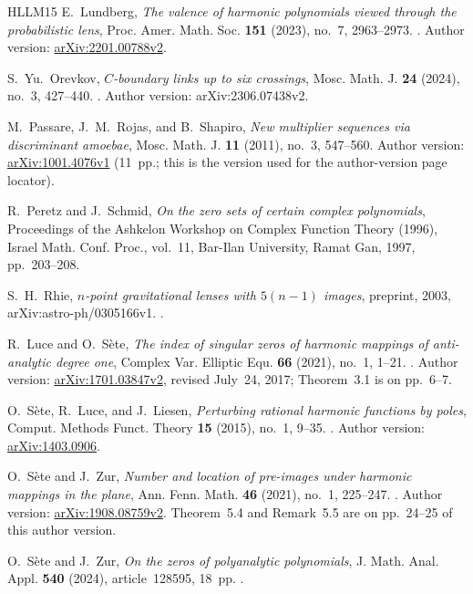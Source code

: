 \documentclass[UTF8,11pt]{ctexart}
\theoremstyle{definition}
\numberwithin{equation}{section}
\begin{document}
\begin{thebibliography}{HLLM15}
E.~Lundberg,
\emph{The valence of harmonic polynomials viewed through the probabilistic lens},
Proc. Amer. Math. Soc. \textbf{151} (2023), no.~7, 2963--2973.
.
Author version: \href{https://arxiv.org/abs/2201.00788v2}{arXiv:2201.00788v2}.

S.~Yu.~Orevkov,
\emph{$C$-boundary links up to six crossings},
Mosc. Math. J. \textbf{24} (2024), no.~3, 427--440.
.
Author version: arXiv:2306.07438v2.

M.~Passare, J.~M.~Rojas, and B.~Shapiro,
\emph{New multiplier sequences via discriminant amoebae},
Mosc. Math. J. \textbf{11} (2011), no.~3, 547--560.
Author version: \href{https://arxiv.org/abs/1001.4076v1}{arXiv:1001.4076v1}
(11~pp.; this is the version used for the author-version page locator).

R.~Peretz and J.~Schmid,
\emph{On the zero sets of certain complex polynomials},
Proceedings of the Ashkelon Workshop on Complex Function Theory (1996),
Israel Math. Conf. Proc., vol.~11, Bar-Ilan University, Ramat Gan, 1997,
pp.~203--208.

S.~H.~Rhie,
\emph{$n$-point gravitational lenses with $5(n-1)$ images},
preprint, 2003, arXiv:astro-ph/0305166v1.
.

R.~Luce and O.~S\`ete,
\emph{The index of singular zeros of harmonic mappings of anti-analytic degree one},
Complex Var. Elliptic Equ. \textbf{66} (2021), no.~1, 1--21.
.
Author version: \href{https://arxiv.org/abs/1701.03847v2}{arXiv:1701.03847v2},
revised July~24, 2017; Theorem~3.1 is on pp.~6--7.

O.~S\`ete, R.~Luce, and J.~Liesen,
\emph{Perturbing rational harmonic functions by poles},
Comput. Methods Funct. Theory \textbf{15} (2015), no.~1, 9--35.
.
Author version: \href{https://arxiv.org/abs/1403.0906}{arXiv:1403.0906}.

O.~S\`ete and J.~Zur,
\emph{Number and location of pre-images under harmonic mappings in the plane},
Ann. Fenn. Math. \textbf{46} (2021), no.~1, 225--247.
.
Author version: \href{https://arxiv.org/abs/1908.08759v2}{arXiv:1908.08759v2}.
Theorem~5.4 and Remark~5.5 are on pp.~24--25 of this author version.

O.~S\`ete and J.~Zur,
\emph{On the zeros of polyanalytic polynomials},
J. Math. Anal. Appl. \textbf{540} (2024), article~128595, 18~pp.
.


\end{thebibliography}
\end{document}
